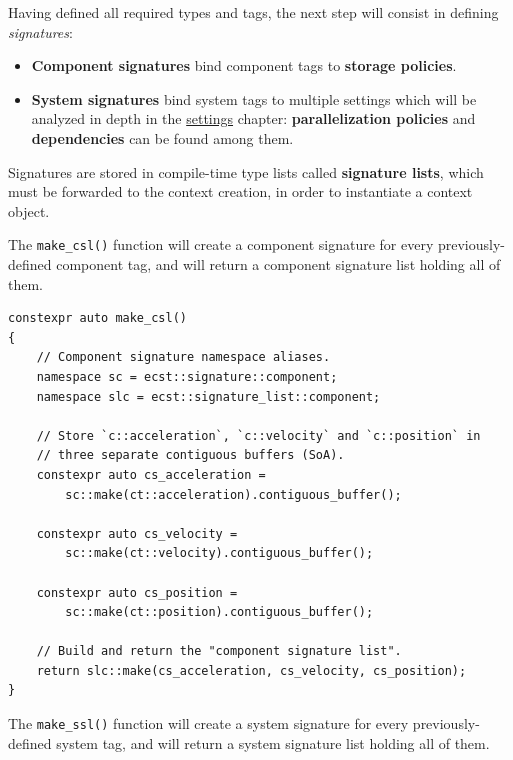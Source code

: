 \documentclass[twoside, 12pt, a4paper, openany]{book}
\begin{document}
Having defined all required types and tags, the next step will consist
in defining \emph{signatures}:

\begin{itemize}
\item
  \textbf{Component signatures} bind component tags to \textbf{storage
  policies}.
\item
  \textbf{System signatures} bind system tags to multiple settings which
  will be analyzed in depth in the
  \protect\hyperlink{system_sigs}{settings} chapter:
  \textbf{parallelization policies} and \textbf{dependencies} can be
  found among them.
\end{itemize}

Signatures are stored in compile-time type lists called
\textbf{signature lists}, which must be forwarded to the context
creation, in order to instantiate a context object.

The
\texttt{make_csl()}
function will create a component signature for every previously-defined
component tag, and will return a component signature list holding all of
them.

\begin{verbatim}
constexpr auto make_csl()
{
    // Component signature namespace aliases.
    namespace sc = ecst::signature::component;
    namespace slc = ecst::signature_list::component;

    // Store `c::acceleration`, `c::velocity` and `c::position` in
    // three separate contiguous buffers (SoA).
    constexpr auto cs_acceleration =
        sc::make(ct::acceleration).contiguous_buffer();

    constexpr auto cs_velocity =
        sc::make(ct::velocity).contiguous_buffer();

    constexpr auto cs_position =
        sc::make(ct::position).contiguous_buffer();

    // Build and return the "component signature list".
    return slc::make(cs_acceleration, cs_velocity, cs_position);
}
\end{verbatim}

The
\texttt{make_ssl()}
function will create a system signature for every previously-defined
system tag, and will return a system signature list holding all of them.
\end{document}

